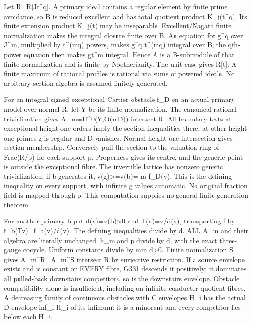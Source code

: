 Let B=R[Jt\textasciicircum{}q]. A primary ideal contains a regular element by finite prime avoidance, so B is reduced excellent and has total quotient product K\_j(t\textasciicircum{}q). Its finite extension product K\_j(t) may be inseparable. Excellent/Nagata finite normalization makes the integral closure finite over B. An equation for g\textasciicircum{}q over J\textasciicircum{}m, multiplied by t\textasciicircum{}(mq) powers, makes g\textasciicircum{}q t\textasciicircum{}(mq) integral over B; the qth-power equation then makes gt\textasciicircum{}m integral. Hence A is a B-submodule of that finite normalization and is finite by Noetherianity. The unit case gives R[t]. A finite maximum of rational profiles is rational via sums of powered ideals. No arbitrary section algebra is assumed finitely generated.

For an integral signed exceptional Cartier obstacle f\_D on an actual primary model over normal R, let Y be its finite normalization. The canonical rational trivialization gives A\_m=H\textasciicircum{}0(Y,O(mD)) intersect R. All-boundary tests at exceptional height-one orders imply the section inequalities there; at other height-one primes g is regular and D vanishes. Normal height-one intersection gives section membership. Conversely pull the section to the valuation ring of Frac(R/p) for each support p. Properness gives its centre, and the generic point is outside the exceptional fibre. The invertible lattice has nonzero generic trivialization; if b generates it, v(g)\textgreater{}=v(b)=-m f\_D(v). This is the defining inequality on every support, with infinite g values automatic. No original fraction field is mapped through p. This computation supplies no general finite-generation theorem.

For another primary b put d(v)=v(b)\textgreater{}0 and T(v)=v/d(v), transporting f by f\_b(Tv)=f\_a(v)/d(v). The defining inequalities divide by d. ALL A\_m and their algebra are literally unchanged; h\_m and p divide by d, with the exact three-gauge cocycle. Uniform constants divide by min d\textgreater{}0. Finite normalization S gives A\_m\textasciicircum{}R=A\_m\textasciicircum{}S intersect R by surjective restriction. If a source envelope exists and is constant on EVERY fibre, G331 descends it positively; it dominates all pulled-back downstairs competitors, so is the downstairs envelope. Obstacle compatibility alone is insufficient, including on infinite-conductor quotient fibres. A decreasing family of continuous obstacles with C envelopes H\_i has the actual D envelope inf\_i H\_i of its infimum: it is a minorant and every competitor lies below each H\_i.

